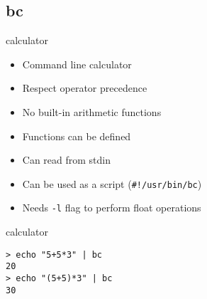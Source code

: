 \subsection{bc}

\begin{frame}[fragile]{calculator}
  \begin{itemize}
    \pause \item Command line calculator
    \pause \item Respect operator precedence
    \pause \item No built-in arithmetic functions
    \pause \item Functions can be defined
    \pause \item Can read from stdin
    \pause \item Can be used as a script (\texttt{\#!/usr/bin/bc})
    \pause \item Needs \texttt{-l} flag to perform float operations
  \end{itemize}
\end{frame}
  

\begin{frame}[fragile]{calculator}
  \begin{exampleblock}{}
    \begin{lstlisting}[showstringspaces=false]
> echo "5+5*3" | bc
20
> echo "(5+5)*3" | bc
30
    \end{lstlisting}
  \end{exampleblock}
\end{frame}
